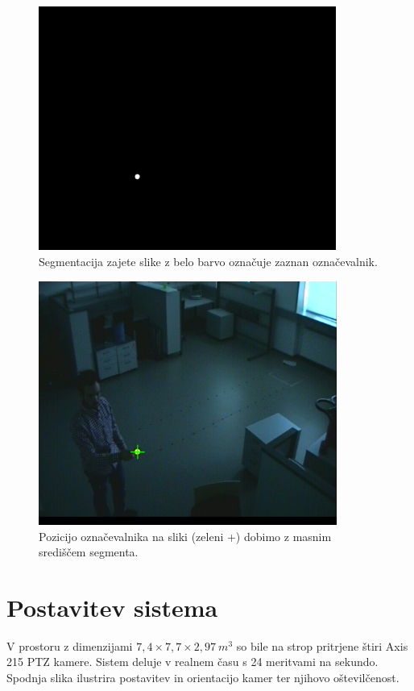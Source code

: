 \documentclass[a4paper, 12pt]{book}
\begin{document}
\begin{figure}[H]
\centering
\includegraphics[height=8cm]{segmented.png}
\caption{Segmentacija zajete slike z belo barvo označuje zaznan označevalnik.}
\label{segmentedimg}
\end{figure}

\begin{figure}[H]
\centering
\includegraphics[height=8cm]{detected.png}
\caption{Pozicijo označevalnika na sliki (zeleni +) dobimo z masnim središčem segmenta.}
\label{detectedimg}
\end{figure}

\section{Postavitev sistema}
V prostoru z dimenzijami $7,4 \times 7,7 \times 2,97 \ m^3$ so bile na strop pritrjene štiri Axis 215 PTZ kamere. Sistem deluje v realnem času s 24 meritvami na sekundo. Spodnja slika ilustrira postavitev in orientacijo kamer ter njihovo oštevilčenost.
\end{document}

